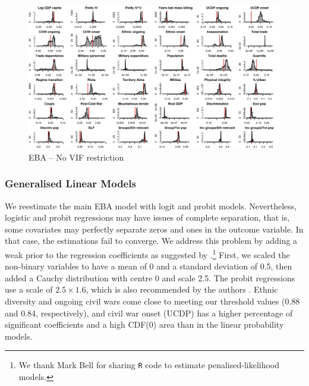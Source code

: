 \documentclass[a4paper,12pt]{article}
\begin{document}
\clearpage
\begin{figure}
    \centering
    \includegraphics[width=\textwidth]{images/mk-no-vif.pdf}
    \caption{EBA -- No VIF restriction}
    \label{fig:mk-no-vif}
\end{figure}
\clearpage

\subsubsection{Generalised Linear Models}

We reestimate the main EBA model with logit and probit models. Nevertheless, logistic and probit regressions may have issues of complete separation, that is, some covariates may perfectly separate zeros and ones in the outcome variable. In that case, the estimations fail to converge. We address this problem by adding a weak prior to the regression coefficients as suggested by \citet{gelman2008weakly}.\footnote{We thank Mark Bell for sharing \texttt{R} code to estimate penalised-likelihood models.} First, we scaled the non-binary variables to have a mean of 0 and a standard deviation of 0.5, then added a Cauchy distribution with centre 0 and scale 2.5. The probit regressions use a scale of $2.5 \times 1.6$, which is also recommended by the authors \citep{arm2017rpackage}. Ethnic diversity and ongoing civil wars come close to meeting our threshold values (0.88 and 0.84, respectively), and civil war onset (UCDP) has a higher percentage of significant coefficients and a high CDF(0) area than in the linear probability models.

\vspace{1cm}
\end{document}
